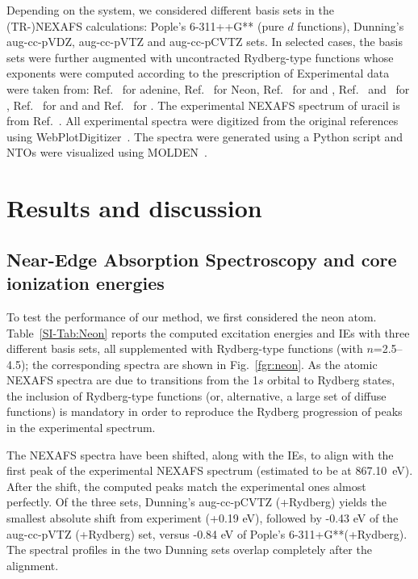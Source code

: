 \documentclass[journal=jctcce,manuscript=article]{achemso}
\begin{document}
Depending on the system, we considered different basis sets  in the (TR-)NEXAFS calculations:  Pople's 6-311++G** (pure $d$ functions), Dunning's aug-cc-pVDZ, aug-cc-pVTZ and aug-cc-pCVTZ sets. In selected cases, the basis sets were further augmented with uncontracted Rydberg-type functions whose exponents were computed according to the prescription of \citeauthor{Rydberg_basis}\cite{Rydberg_basis} 
Experimental data were taken from:  Ref.~
for adenine, Ref.~ for Neon,
Ref.~ for  and ,
Ref.~ and~ for ,
Ref.~ for  and  and Ref.~ for .
The experimental NEXAFS spectrum of uracil is from Ref.~.
All experimental spectra were digitized from the 
original references using WebPlotDigitizer~\cite{WPD}. 
The spectra were generated using a Python script and NTOs were visualized using MOLDEN~\cite{molden}.

\section{Results and discussion}
\subsection{Near-Edge Absorption Spectroscopy and core ionization energies}

To test the performance of our method, we first considered the neon atom.  Table~\ref{SI-Tab:Neon} reports the computed excitation energies and IEs with three different basis sets, all supplemented with Rydberg-type functions (with $n$=2.5--4.5); the corresponding spectra are shown in Fig.~\ref{fgr:neon}. 
As the atomic NEXAFS spectra are due to transitions from the 1$s$ orbital to Rydberg states, the inclusion of Rydberg-type functions (or, alternative, a large set of diffuse functions) is mandatory in order to reproduce the Rydberg progression of peaks in the experimental spectrum.~\cite{coriani2012pra}

The NEXAFS spectra have been shifted, along with the IEs, to align with the first peak of the experimental NEXAFS spectrum (estimated to be at 867.10~eV). After the shift, the computed peaks match the  experimental ones almost perfectly. Of the three sets, Dunning's aug-cc-pCVTZ (+Rydberg) yields the smallest absolute shift from experiment (+0.19 eV), followed by -0.43 eV of the aug-cc-pVTZ (+Rydberg) set, versus -0.84 eV of Pople's  6-311+G**(+Rydberg). The spectral profiles in the two Dunning sets overlap completely after the alignment. 
\end{document}
